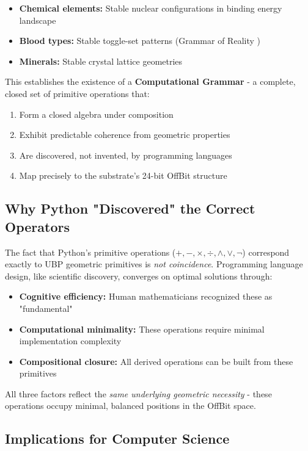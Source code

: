 \documentclass[12pt,a4paper]{article}
\begin{document}
\begin{itemize}
    \item \textbf{Chemical elements:} Stable nuclear configurations in binding energy landscape
    \item \textbf{Blood types:} Stable toggle-set patterns (Grammar of Reality \cite{Grammar_Reality})
    \item \textbf{Minerals:} Stable crystal lattice geometries
\end{itemize}

This establishes the existence of a \textbf{Computational Grammar} - a complete, closed set of primitive operations that:

\begin{enumerate}
    \item Form a closed algebra under composition
    \item Exhibit predictable coherence from geometric properties
    \item Are discovered, not invented, by programming languages
    \item Map precisely to the substrate's 24-bit OffBit structure
\end{enumerate}

\subsection{Why Python "Discovered" the Correct Operators}

The fact that Python's primitive operations ($+, -, \times, \div, \land, \lor, \neg$) correspond exactly to UBP geometric primitives is \emph{not coincidence}. Programming language design, like scientific discovery, converges on optimal solutions through:

\begin{itemize}
    \item \textbf{Cognitive efficiency:} Human mathematicians recognized these as "fundamental"
    \item \textbf{Computational minimality:} These operations require minimal implementation complexity
    \item \textbf{Compositional closure:} All derived operations can be built from these primitives
\end{itemize}

All three factors reflect the \emph{same underlying geometric necessity} - these operations occupy minimal, balanced positions in the OffBit space.

\subsection{Implications for Computer Science}
\end{document}

